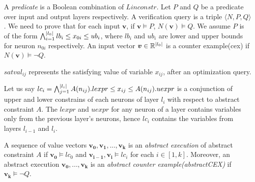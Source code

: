 A {\em predicate} is a Boolean combination of $Linconstr$.
Let $P$ and $Q$ be a predicate over input and output layers respectively.
A verification query is a triple $\langle N, P, Q \rangle$.
We need to prove that for each input $\boldsymbol{v}$,
if $\boldsymbol{v} \models P$, $N(\boldsymbol{v}) \models Q$.
We assume $P$ is of the form
$\bigwedge_{i=1}^{|l_0|}lb_i \leq x_{0i} \leq ub_i$, where $lb_i$ and $ub_i$ are lower and upper bounds for neuron $n_{0i}$ respectively.
An input vector $\boldsymbol{v} \in \mathbb{R}^{|l_0|}$ is a counter example(cex) if $N(\boldsymbol{v}) \models \lnot Q$.  



$satval_{ij}$ represents the satisfying value of variable $x_{ij}$, after an optimization query.






Let us say $lc_i = \bigwedge_{j=1}^{|l_i|} A(n_{ij}).lexpr \leq x_{ij} \leq  A(n_{ij}).uexpr$ is a 
conjunction of upper and lower constrains of each neurons of layer $l_i$ with respect to abstract constraint $A$.
The $lexpr$ and $uexpr$ for any neuron of a layer contains variables only from the previous layer's neurons, 
hence $lc_i$ contains the variables from layers $l_{i-1}$ and $l_i$. 

\begin{df}
  A sequence of value vectors $\boldsymbol{v_0}, \boldsymbol{v_1}, ... , \boldsymbol{v_k}$ is an 
  {\em abstract execution} of abstract constraint $A$ if 
  $\boldsymbol{v_0} \models lc_0$ and $\boldsymbol{v_{i-1}}, \boldsymbol{v_i} \models lc_i$ for each $i \in [1,k]$.  
 Moreover, an abstract execution $\boldsymbol{v_0,...,v_k}$ is
 an {\em abstract counter example(abstractCEX)} if $\boldsymbol{v_k} \models \lnot Q$.
\end{df}

